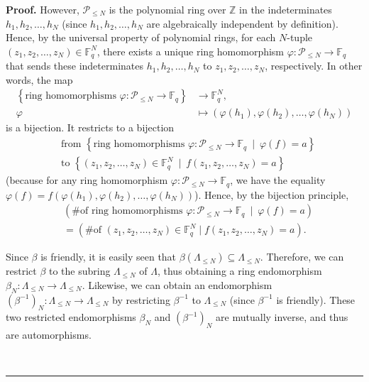 \documentclass[numbers=enddot,12pt,final,onecolumn,notitlepage]{scrartcl}%
\theoremstyle{definition}
\newenvironment{proof}[1][Proof]{\noindent\textbf{#1.} }{\ \rule{0.5em}{0.5em}}
\newenvironment{verlong}{}{}
\newcommand{\Fq}{\mathbb{F}_q}
\renewcommand{\leq}{\leqslant}
\theoremstyle{plainsl}
\begin{document}
\begin{verlong}
\begin{proof}
However, $\mathcal{P}_{\leq N}$ is the polynomial ring over $\mathbb{Z}$ in
the indeterminates $h_{1},h_{2},\ldots,h_{N}$ (since $h_{1},h_{2},\ldots
,h_{N}$ are algebraically independent by definition). Hence, by the universal
property of polynomial rings, for each $N$-tuple $\left(  z_{1},z_{2}%
,\ldots,z_{N}\right)  \in\Fq^{N}$, there exists a unique ring
homomorphism $\varphi:\mathcal{P}_{\leq N}\rightarrow\Fq$ that
sends these indeterminates $h_{1},h_{2},\ldots,h_{N}$ to $z_{1},z_{2}%
,\ldots,z_{N}$, respectively. In other words, the map%
\begin{align*}
\left\{  \text{ring homomorphisms }\varphi:\mathcal{P}_{\leq N}\rightarrow
\Fq\right\}    & \rightarrow\Fq^{N},\\
\varphi & \mapsto\left(  \varphi\left(  h_{1}\right)  ,\varphi\left(
h_{2}\right)  ,\ldots,\varphi\left(  h_{N}\right)  \right)
\end{align*}
is a bijection. It restricts to a bijection
\begin{align*}
& \text{from }\left\{  \text{ring homomorphisms }\varphi:\mathcal{P}_{\leq
N}\rightarrow\Fq\ \mid\ \varphi\left(  f\right)  =a\right\}  \\
& \text{to }\left\{  \left(  z_{1},z_{2},\ldots,z_{N}\right)  \in
\Fq^{N}\ \mid\ f\left(  z_{1},z_{2},\ldots,z_{N}\right)
=a\right\}
\end{align*}
(because for any ring homomorphism $\varphi:\mathcal{P}_{\leq N}%
\rightarrow\Fq$, we have the equality
$\varphi\left(  f\right)  =f\left(
\varphi\left(  h_{1}\right)  ,\varphi\left(  h_{2}\right)  ,\ldots
,\varphi\left(  h_{N}\right)  \right)  $). Hence, by the bijection principle,%
\begin{align}
& \left(  \text{\# of ring homomorphisms }\varphi:\mathcal{P}_{\leq
N}\rightarrow\Fq\ \mid\ \varphi\left(  f\right)  =a\right)
\nonumber\\
& =\left(  \text{\# of }\left(  z_{1},z_{2},\ldots,z_{N}\right)  \in
\Fq^{N}\mid f\left(  z_{1},z_{2},\ldots,z_{N}\right)  =a\right)
.\label{pf.prop.friendly-aut.1}%
\end{align}


Since $\beta$ is friendly, it is easily seen that $\beta\left(  \Lambda_{\leq
N}\right)  \subseteq\Lambda_{\leq N}$. Therefore, we can restrict $\beta$ to
the subring $\Lambda_{\leq N}$ of $\Lambda$, thus obtaining a ring
endomorphism $\beta_{N}:\Lambda_{\leq N}\rightarrow\Lambda_{\leq N}$.
Likewise, we can obtain an endomorphism $\left(  \beta^{-1}\right)
_{N}:\Lambda_{\leq N}\rightarrow\Lambda_{\leq N}$ by restricting $\beta^{-1}$
to $\Lambda_{\leq N}$ (since $\beta^{-1}$ is friendly). These two restricted
endomorphisms $\beta_{N}$ and $\left(  \beta^{-1}\right)  _{N}$ are mutually
inverse, and thus are automorphisms.


\end{proof}
\end{verlong}
\end{document}
